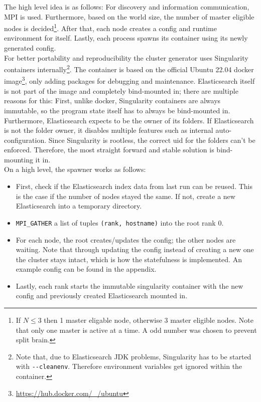 The high level idea is as follows: For discovery and information communication, \ac{MPI} is used. Furthermore, based on the world size, the number of master eligible nodes is decided\footnote{If $N \leq 3$ then 1 master eligable node, otherwise 3 master eligible nodes. Note that only one master is active at a time. A odd number was chosen to prevent split brain.}. After that, each node creates a config and runtime environment for itself. Lastly, each process spawns its container using its newly generated config.\\

For better portability and reproducibility the cluster generator uses Singularity containers internally\footnote{Note that, due to Elasticsearch JDK problems, Singularity has to be started with \texttt{-{}-cleanenv}. Therefore environment variables get ignored within the container.}. The container is based on the official Ubuntu 22.04 docker image\footnote{\url{https://hub.docker.com/_/ubuntu}}, only adding packages for debugging and maintenance. Elasticsearch itself is not part of the image and completely bind-mounted in; there are multiple reasons for this: First, unlike docker, Singularity containers are always immutable, so the program state itself has to always be bind-mounted in. Furthermore, Elasticsearch expects to be the owner of its folders. If Elasticsearch is not the folder owner, it disables multiple features such as internal auto-configuration. Since Singularity is rootless, the correct uid for the folders can't be enforced. Therefore, the most straight forward and stable solution is bind-mounting it in.\\

On a high level, the spawner works as follows:
\begin{itemize}
  \item First, check if the Elasticsearch index data from last run can be reused. This is the case if the number of nodes stayed the same. If not, create a new Elasticsearch into a temporary directory.
  \item \texttt{MPI\_GATHER} a list of tuples \texttt{(rank, hostname)} into the root rank 0.
  \item For each node, the root creates/updates the config; the other nodes are waiting. Note that through updating the config instead of creating a new one the cluster stays intact, which is how the statefulness is implemented. An example config can be found in the appendix.
  \item Lastly, each rank starts the immutable singularity container with the new config and previously created Elasticsearch mounted in.
\end{itemize}

